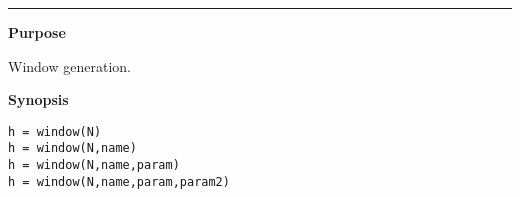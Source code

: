 

\hspace*{-1.6cm}{\Large \bf window}

\vspace*{-.4cm}
\hspace*{-1.6cm}\rule[0in]{16.5cm}{.02cm}
\vspace*{.2cm}

{\bf \large {}\selectfont Purpose}\\
\hspace*{1.5cm}
\begin{minipage}[t]{13.5cm}
Window generation.
\end{minipage}
\vspace*{.5cm}

{\bf \large {}\selectfont Synopsis}\\
\hspace*{1.5cm}
\begin{minipage}[t]{13.5cm}
\begin{verbatim}
h = window(N)
h = window(N,name)
h = window(N,name,param)
h = window(N,name,param,param2)
\end{verbatim}
\end{minipage}
\vspace*{.5cm}

